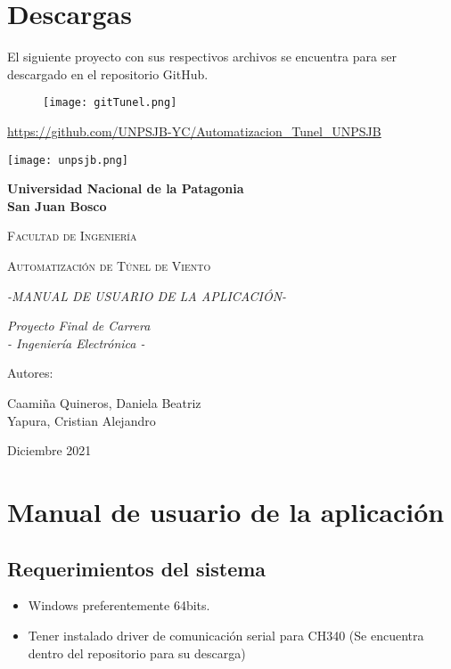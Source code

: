 \section{Descargas}
El siguiente proyecto con sus respectivos archivos se encuentra para ser descargado en el repositorio GitHub.
\begin{figure}[htb]
	\centering
	\texttt{[image: gitTunel.png]}
	\label{fig:git}
\end{figure}

\url{https://github.com/UNPSJB-YC/Automatizacion_Tunel_UNPSJB}
\newpage






\begin{center}
		{\texttt{[image: unpsjb.png]}\par}
	\vspace{1cm}
	{\bfseries\LARGE Universidad Nacional de la Patagonia\\ San Juan Bosco \par}
	\vspace{1cm}
	{\scshape\Large Facultad de Ingenier\'ia \par}
	\vspace{3cm}
	{\scshape\Huge Automatización de Túnel de Viento \par}
		{\itshape\Large -MANUAL DE USUARIO DE LA APLICACIÓN- \par}
	
	
	\vspace{3cm}
	{\itshape\Large Proyecto Final de Carrera\\ - Ingeniería Electrónica - \par}
	\vfill
	{\Large Autores: \par}
	{\Large Caamiña Quineros, Daniela Beatriz\\ Yapura, Cristian Alejandro \par}
	\vfill
	{\Large Diciembre 2021 \par}
\end{center}





\newpage






\section{Manual de usuario de la aplicación}
\subsection{Requerimientos del sistema}
\begin{itemize}
	\item Windows preferentemente 64bits.
	\item Tener instalado driver de comunicación serial para CH340 (Se encuentra dentro del repositorio para su descarga) 
\end{itemize}


